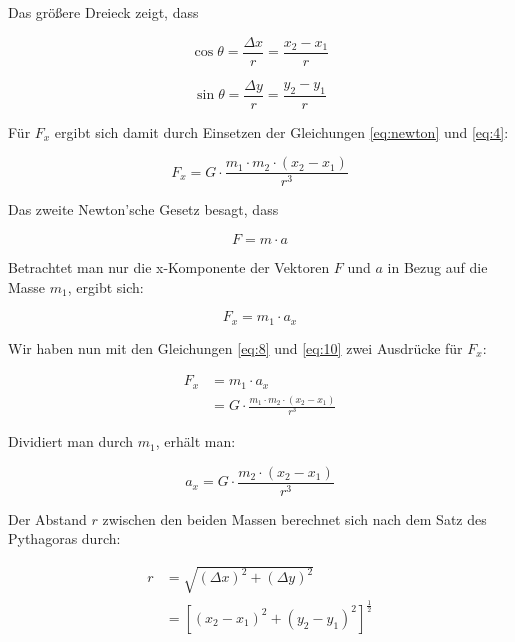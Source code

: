 \documentclass[10pt,twocolumn]{scrartcl}
\begin{document}
Das größere Dreieck zeigt, dass

\begin{equation}\cos \theta = \frac{\Delta x}{r} = \frac{x_2 - x_1}{r}
\label{eq:4}
\end{equation}

\begin{equation}\sin \theta = \frac{\Delta y}{r} = \frac{y_2 - y_1}{r}
\label{eq:5}
\end{equation}

Für $F_x$ ergibt sich damit durch Einsetzen der Gleichungen \eqref{eq:newton} und \eqref{eq:4}:

\begin{equation}F_x = G \cdot \frac{m_1 \cdot m_2 \cdot (x_2 - x_1)}{r^3}
\label{eq:8}
\end{equation}

Das zweite Newton'sche Gesetz besagt, dass

\begin{equation}F = m \cdot a
\label{eq:9}
\end{equation}

Betrachtet man nur die x-Komponente der Vektoren $F$ und $a$ in Bezug auf die Masse $m_1$, ergibt sich:

\begin{equation}F_x = m_1 \cdot a_x
\label{eq:10}
\end{equation}

Wir haben nun mit den Gleichungen \eqref{eq:8} und \eqref{eq:10} zwei Ausdrücke für $F_x$:

\begin{equation}
	\begin{aligned}
		F_x {} & = m_1 \cdot a_x \\
  			& = G \cdot \frac{m_1 \cdot m_2 \cdot (x_2 - x_1)}{r^3}
	\end{aligned}
\label{eq:11}
\end{equation}

Dividiert man durch $m_1$, erhält man:

\begin{equation}a_x = G \cdot \frac{m_2 \cdot (x_2 - x_1)}{r^3}
\label{eq:12}
\end{equation}

Der Abstand $r$ zwischen den beiden Massen berechnet sich nach dem Satz des Pythagoras durch:

\begin{equation}
	\begin{aligned}
		r {} & = \sqrt{(\Delta x)^2 + (\Delta y)^2} \\
  			& = [(x_2-x_1)^2 + (y_2-y_1)^2]^\frac{1}{2}
	\end{aligned}
\label{eq:13}
\end{equation}
\end{document}
